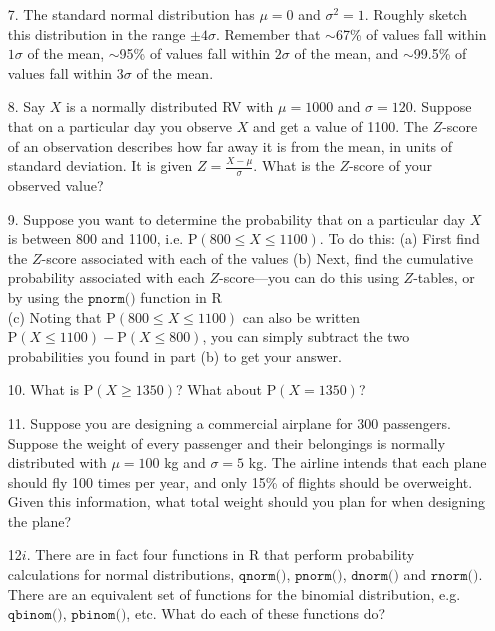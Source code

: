 \documentclass[10pt]{extarticle}
\renewcommand{\P}{\text{P}}
\begin{document}
\begin{itemize}

	\item[7.] The standard normal distribution has $\mu = 0$ and $\sigma^2 = 1$. Roughly sketch this distribution in the range $\pm 4\sigma$. Remember that $\sim$67\% of values fall within $1\sigma$ of the mean, $\sim$95\% of values fall within $2\sigma$ of the mean, and $\sim$99.5\% of values fall within $3\sigma$ of the mean. \\ 

	\item[8.] Say $X$ is a normally distributed RV with $\mu = 1000$ and $\sigma = 120$. Suppose that on a particular day you observe $X$ and get a value of 1100. The $Z$-score of an observation describes how far away it is from the mean, in units of standard deviation. It is given $Z = \frac{X - \mu}{\sigma}$. What is the $Z$-score of your observed value? \\  

	\item[9.] Suppose you want to determine the probability that on a particular day $X$ is between 800 and 1100, i.e. $\P(800 \leq X \leq 1100)$. To do this: (a) First find the $Z$-score associated with each of the values (b) Next, find the cumulative probability associated with each $Z$-score---you can do this using $Z$-tables, or by using the $\texttt{pnorm()}$ function in R \\ 
(c) Noting that $\P(800 \leq X \leq 1100)$ can also be written $\P(X \leq 1100) - \P(X \leq 800)$, you can simply subtract the two probabilities you found in part (b) to get your answer. \\  

	\item[10.] What is $\P(X \geq 1350)$? What about $\P(X = 1350)$? \\ 

	\item[11.] Suppose you are designing a commercial airplane for 300 passengers. Suppose the weight of every passenger and their belongings is normally distributed with $\mu = 100$ kg and $\sigma = 5$ kg. The airline intends that each plane should fly 100 times per year, and only 15\% of flights should be overweight. Given this information, what total weight should you plan for when designing the plane? \\  

	\item[12$i$.] There are in fact four functions in R that perform probability calculations for normal distributions, $\texttt{qnorm()}$, $\texttt{pnorm()}$, $\texttt{dnorm()}$ and $\texttt{rnorm()}$. There are an equivalent set of functions for the binomial distribution, e.g. $\texttt{qbinom()}$, $\texttt{pbinom()}$, etc. What do each of these functions do? 

\end{itemize}
\end{document}
